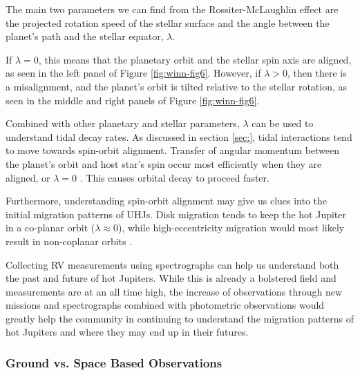 \documentclass[oneside,12pt]{amsart}
\numberwithin{page}{section}
\begin{document}
The main two parameters we can find from the Rossiter-McLaughlin effect are the projected rotation speed of the stellar surface and the angle between the planet's path and the stellar equator, $\lambda$.

If $\lambda = 0$, this means that the planetary orbit and the stellar spin axis are aligned, as seen in the left panel of Figure \ref{fig:winn-fig6}. However, if $\lambda > 0$, then there is a misalignment, and the planet's orbit is tilted relative to the stellar rotation, as seen in the middle and right panels of Figure \ref{fig:winn-fig6}.

Combined with other planetary and stellar parameters, $\lambda$ can be used to understand tidal decay rates. As discussed in section \ref{sec:}, tidal interactions tend to move towards spin-orbit alignment. Transfer of angular momentum between the planet's orbit and host star's spin occur most efficiently when they are aligned, or $\lambda = 0$ \citet{ogilvie2014tidal}. This causes orbital decay to proceed faster.

Furthermore, understanding spin-orbit alignment may give us clues into the initial migration patterns of UHJs. Disk migration tends to keep the hot Jupiter in a co-planar orbit ($\lambda \approx 0$), while high-eccentricity migration would most likely result in non-coplanar orbits \citep{triaud2017rossiter}.

Collecting RV measurements using spectrographs can help us understand both the past and future of hot Jupiters. While this is already a bolstered field and measurements are at an all time high, the increase of observations through new missions and spectrographs combined with photometric observations would greatly help the community in continuing to understand the migration patterns of hot Jupiters and where they may end up in their futures.


\subsubsection{Ground vs. Space Based Observations}
\end{document}
